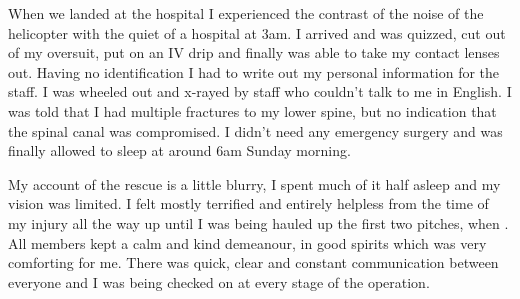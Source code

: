     When we landed at the hospital I experienced the contrast of the noise of the helicopter with the quiet of a hospital at 3am. I arrived and was quizzed, cut out of my oversuit, put on an IV drip and finally was able to take my contact lenses out. Having no identification I had to write out my personal information for the staff. I was wheeled out and x-rayed by staff who couldn’t talk to me in English. I was told that I had multiple fractures to my lower spine, but no indication that the spinal canal was compromised. I didn’t need any emergency surgery and was finally allowed to sleep at around 6am Sunday morning.

    My account of the rescue is a little blurry, I spent much of it half asleep and my vision was limited. I felt mostly terrified and entirely helpless from the time of my injury all the way up until I was being hauled up the first two pitches, when . All members kept a calm and kind demeanour, in good spirits which was very comforting for me. There was quick, clear and constant communication between everyone and I was being checked on at every stage of the operation.

